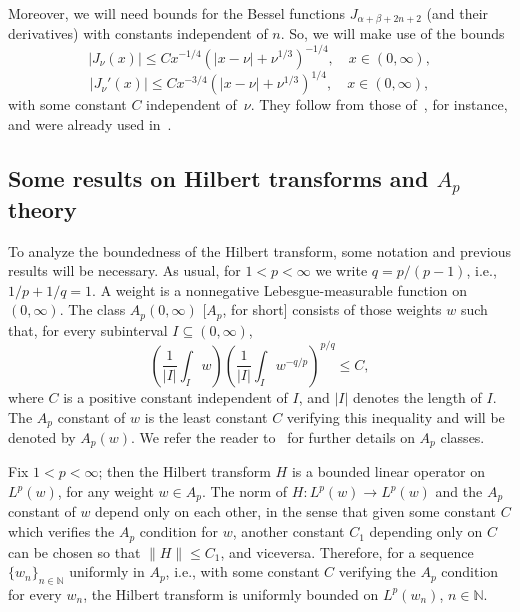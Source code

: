 \documentclass[reqno]{amsart}
\theoremstyle{plain}
\theoremstyle{definition}
\theoremstyle{remark}
\begin{document}
Moreover, we will need bounds for the Bessel functions
$J_{\alpha+\beta+2n+2}$ (and their derivatives) with constants independent of
$n$. So, we will make use of the bounds
\begin{equation}
\label{ec:jnu}
   |J_\nu(x)| \le C x^{-1/4} \left( |x - \nu| + \nu^{1/3} \right)^{-1/4},
   \quad x \in (0,\infty),
\end{equation}
\begin{equation}
\label{ec:jnu'}
   |J_\nu'(x)| \le C x^{-3/4} \left( |x - \nu| + \nu^{1/3} \right)^{1/4},
   \quad x \in (0,\infty),
\end{equation}
with some constant $C$ independent of~$\nu$. They follow from those
of~\cite{Bar-Cor,Cord}, for instance, and were already used in~\cite{Var}.


\subsection{Some results on Hilbert transforms and $A_p$ theory}

To analyze the boundedness of the Hilbert transform, some notation and
previous results will be necessary. As usual, for $1 < p < \infty$ we
write $q = p/(p-1)$, i.e., $1/p + 1/q = 1$. A weight is a nonnegative
Lebesgue-measurable function on $(0,\infty)$. The class $A_p(0,\infty)$
[$A_p$, for short] consists of those weights $w$ such that, for
every subinterval $I \subseteq (0, \infty)$,
\begin{equation*}
   \left(\frac1{|I|} \int_I w \right)
   \left( \frac1{|I|} \int_I w^{-q/p} \right)^{p/q} \le C,
\end{equation*}
where $C$ is a positive constant independent of $I$, and $|I|$ denotes the
length of $I$. The $A_p$ constant of $w$ is the least constant $C$
verifying this inequality and will be denoted by $A_p(w)$. We refer the reader
to~\cite{GC-RF} for further details on $A_p$ classes.

Fix $1 < p < \infty$; then the Hilbert transform $H$ is a bounded linear
operator on $L^p(w)$, for any weight $w \in A_p$. The norm of $H \colon L^p(w)
\longrightarrow L^p(w)$ and the $A_p$ constant of $w$ depend only on
each other, in the sense that given some constant $C$ which verifies the $A_p$
condition for $w$, another constant $C_1$ depending only on $C$ can be chosen
so that $\| H\| \le C_1$, and viceversa. Therefore, for a sequence $\{w_n\}_{n
\in \mathbb{N}}$ uniformly in $A_p$, i.e., with some constant $C$ verifying
the $A_p$ condition for every $w_n$, the Hilbert transform is uniformly
bounded on $L^p(w_n)$, $n \in \mathbb{N}$.
\end{document}
